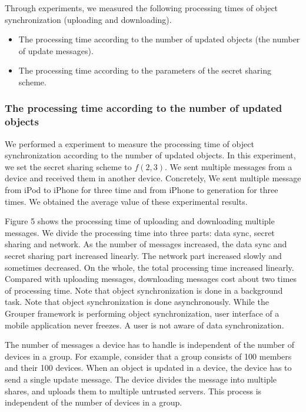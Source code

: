 \documentclass[twocolumn,10pt]{article}
\begin{document}
Through experiments, we measured the following processing times of object synchronization (uploading and downloading).

\begin{itemize}
	\setlength{\itemsep}{1pt}
	\setlength{\parskip}{0pt}
	\setlength{\parsep}{0pt}
	\item The processing time according to the number of updated objects (the number of update messages).
	\item The processing time according to the parameters of the secret sharing scheme.
\end{itemize}

\subsubsection{The processing time according to the number of updated objects}

We performed a experiment to measure the processing time of object synchronization according to the number of updated objects.
In this experiment, we set the secret sharing scheme to ${f(2, 3)}$.
We sent multiple messages from a device and received them in another device. 
Concretely, We sent multiple message from iPod to iPhone for three time and from iPhone to generation for three times.
We obtained the average value of these experimental results.

Figure 5 shows the processing time of uploading and downloading multiple messages.
We divide the processing time into three parts: data sync, secret sharing and network.
As the number of messages increased, the data sync and secret sharing part increased linearly. 
The network part increased slowly and sometimes decreased.
On the whole, the total processing time increased linearly.
Compared with uploading messages, downloading messages cost about two times of processing time.
Note that object synchronization is done in a background task.
Note that object synchronization is done asynchronously.
While the Grouper framework is performing object synchronization, user interface of a mobile application never freezes.
A user is not aware of data synchronization.

The number of messages a device has to handle is independent of the number of devices in a group.
For example, consider that a group consists of 100 members and their 100 devices.
When an object is updated in a device, the device has to send a single update message.
The device divides the message into multiple shares, and uploads them to multiple untrusted servers.
This process is independent of the number of devices in a group. 
\end{document}
